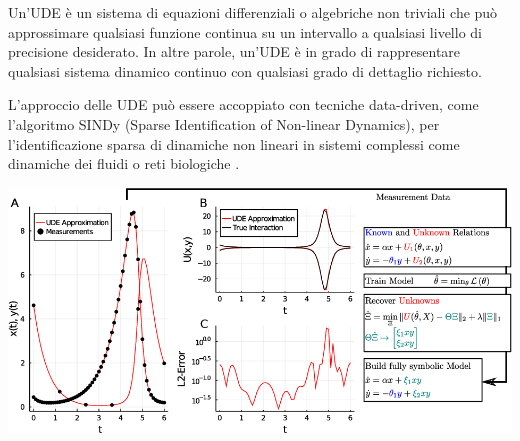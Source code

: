 Un'UDE è un sistema di equazioni differenziali o algebriche non triviali 
che può approssimare qualsiasi funzione continua su un intervallo a 
qualsiasi livello di precisione desiderato. In altre parole, un'UDE è 
in grado di rappresentare qualsiasi sistema dinamico continuo con 
qualsiasi grado di dettaglio richiesto.

L'approccio delle UDE può essere accoppiato con tecniche data-driven, 
come l'algoritmo SINDy (Sparse Identification of Non-linear Dynamics), 
per l'identificazione sparsa di dinamiche non lineari in sistemi 
complessi come dinamiche dei fluidi o reti biologiche \cite{datadrivendiffeq}.

\begin{minipage}{\linewidth}
    \centering
    \includegraphics[width=\textwidth]{img/ude_approx.png}
    \label{fig:UDE_approx}
\end{minipage}